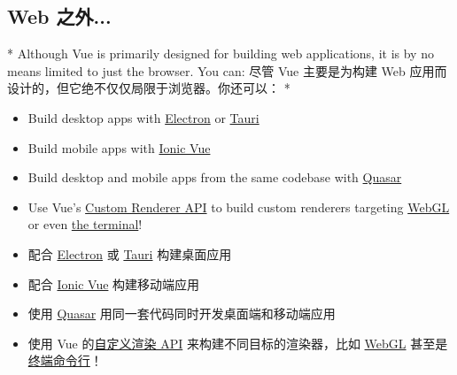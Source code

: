 \begin{paracol}{2}
\subsection{Web 之外...}
\switchcolumn[0]*%
Although Vue is primarily designed for building web applications, it is
by no means limited to just the browser. You can:
\switchcolumn
尽管 Vue 主要是为构建 Web
应用而设计的，但它绝不仅仅局限于浏览器。你还可以：
\switchcolumn[0]*%
\begin{itemize}
\item
  Build desktop apps with \href{https://www.electronjs.org/}{Electron}
  or \href{https://tauri.studio/en/}{Tauri}
\item
  Build mobile apps with
  \href{https://ionicframework.com/docs/vue/overview}{Ionic Vue}
\item
  Build desktop and mobile apps from the same codebase with
  \href{https://quasar.dev/}{Quasar}
\item
  Use Vue's \href{https://vuejs.org/api/custom-renderer.html}{Custom
  Renderer API} to build custom renderers targeting
  \href{https://troisjs.github.io/}{WebGL} or even
  \href{https://github.com/vue-terminal/vue-termui}{the terminal}!
\end{itemize}
\switchcolumn
\begin{itemize}
\item
  配合 \href{https://www.electronjs.org/}{Electron} 或
  \href{https://tauri.studio/en/}{Tauri} 构建桌面应用
\item
  配合 \href{https://ionicframework.com/docs/vue/overview}{Ionic Vue}
  构建移动端应用
\item
  使用 \href{https://quasar.dev/}{Quasar}
  用同一套代码同时开发桌面端和移动端应用
\item
  使用 Vue
  的\href{https://cn.vuejs.org/api/custom-renderer.html}{自定义渲染 API}
  来构建不同目标的渲染器，比如 \href{https://troisjs.github.io/}{WebGL}
  甚至是\href{https://github.com/vue-terminal/vue-termui}{终端命令行}！
\end{itemize}
\end{paracol}
 